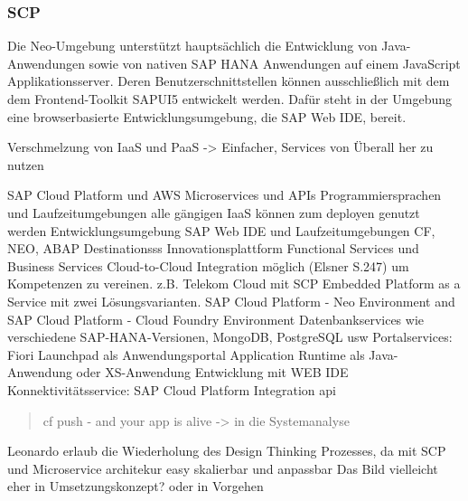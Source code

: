 \subsubsection{SCP}

Die Neo-Umgebung unterstützt hauptsächlich die Entwicklung von Java-Anwendungen sowie von nativen SAP HANA Anwendungen auf einem JavaScript Applikationsserver. Deren Benutzerschnittstellen können ausschließlich mit dem dem Frontend-Toolkit SAPUI5 entwickelt werden. Dafür steht in der Umgebung eine browserbasierte Entwicklungsumgebung, die SAP Web IDE, bereit.

Verschmelzung von IaaS und PaaS -> Einfacher, Services von Überall her zu nutzen





SAP Cloud Platform und AWS Microservices und APIs
Programmiersprachen und Laufzeitumgebungen
alle gängigen IaaS können zum deployen genutzt werden
Entwicklungsumgebung SAP Web IDE und Laufzeitumgebungen
CF, NEO, ABAP
Destinationsss
Innovationsplattform
Functional Services und Business Services
Cloud-to-Cloud Integration möglich (Elsner S.247) um Kompetenzen zu vereinen. z.B. Telekom Cloud mit SCP
Embedded Platform as a Service mit zwei Lösungsvarianten. SAP Cloud Platform - Neo Environment and SAP Cloud Platform - Cloud Foundry Environment
Datenbankservices wie verschiedene SAP-HANA-Versionen, MongoDB, PostgreSQL usw
Portalservices: Fiori Launchpad als Anwendungsportal
Application Runtime als Java-Anwendung oder XS-Anwendung Entwicklung mit WEB IDE
Konnektivitätsservice: SAP Cloud Platform Integration
\ac{api}

\begin{quotation}
  cf push - and your app is alive -> in die Systemanalyse
\end{quotation}


Leonardo erlaub die Wiederholung des Design Thinking Prozesses, da mit SCP und Microservice architekur easy skalierbar und anpassbar
Das Bild vielleicht eher in Umsetzungskonzept? oder in Vorgehen
